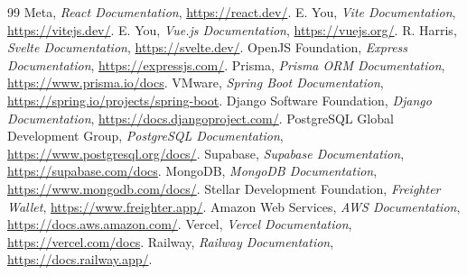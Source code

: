 \documentclass[12pt,oneside]{report}
\begin{document}
\begin{thebibliography}{99}
       Meta, \textit{React Documentation}, \url{https://react.dev/}.
       E. You, \textit{Vite Documentation}, \url{https://vitejs.dev/}.
       E. You, \textit{Vue.js Documentation}, \url{https://vuejs.org/}.
       R. Harris, \textit{Svelte Documentation}, \url{https://svelte.dev/}.
       OpenJS Foundation, \textit{Express Documentation}, \url{https://expressjs.com/}.
       Prisma, \textit{Prisma ORM Documentation}, \url{https://www.prisma.io/docs}.
       VMware, \textit{Spring Boot Documentation}, \url{https://spring.io/projects/spring-boot}.
       Django Software Foundation, \textit{Django Documentation}, \url{https://docs.djangoproject.com/}.
       PostgreSQL Global Development Group, \textit{PostgreSQL Documentation}, \url{https://www.postgresql.org/docs/}.
       Supabase, \textit{Supabase Documentation}, \url{https://supabase.com/docs}.
       MongoDB, \textit{MongoDB Documentation}, \url{https://www.mongodb.com/docs/}.
       Stellar Development Foundation, \textit{Freighter Wallet}, \url{https://www.freighter.app/}.
       Amazon Web Services, \textit{AWS Documentation}, \url{https://docs.aws.amazon.com/}.
       Vercel, \textit{Vercel Documentation}, \url{https://vercel.com/docs}.
       Railway, \textit{Railway Documentation}, \url{https://docs.railway.app/}.
    \end{thebibliography}
\end{document}
